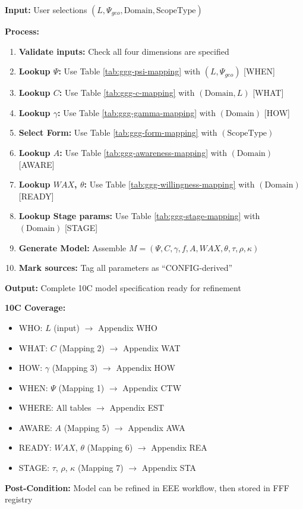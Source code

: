 \begin{tcolorbox}[colback=gray!5!white, colframe=gray!75!black,
    title=Algorithm CONFIG-1: Model Generation (10C Complete)]
\textbf{Input:} User selections $(L, \Psi_{geo}, \text{Domain}, \text{ScopeType})$

\textbf{Process:}
\begin{enumerate}
\item \textbf{Validate inputs:} Check all four dimensions are specified
\item \textbf{Lookup $\Psi$:} Use Table \ref{tab:ggg-psi-mapping} with $(L, \Psi_{geo})$ \hfill [WHEN]
\item \textbf{Lookup $C$:} Use Table \ref{tab:ggg-c-mapping} with $(\text{Domain}, L)$ \hfill [WHAT]
\item \textbf{Lookup $\gamma$:} Use Table \ref{tab:ggg-gamma-mapping} with $(\text{Domain})$ \hfill [HOW]
\item \textbf{Select Form:} Use Table \ref{tab:ggg-form-mapping} with $(\text{ScopeType})$
\item \textbf{Lookup $A$:} Use Table \ref{tab:ggg-awareness-mapping} with $(\text{Domain})$ \hfill [AWARE]
\item \textbf{Lookup $WAX$, $\theta$:} Use Table \ref{tab:ggg-willingness-mapping} with $(\text{Domain})$ \hfill [READY]
\item \textbf{Lookup Stage params:} Use Table \ref{tab:ggg-stage-mapping} with $(\text{Domain})$ \hfill [STAGE]
\item \textbf{Generate Model:} Assemble $M = (\Psi, C, \gamma, f, A, WAX, \theta, \tau, \rho, \kappa)$
\item \textbf{Mark sources:} Tag all parameters as ``CONFIG-derived''
\end{enumerate}

\textbf{Output:} Complete 10C model specification ready for refinement

\textbf{10C Coverage:}
\begin{itemize}[nosep]
\item WHO: $L$ (input) $\rightarrow$ Appendix WHO
\item WHAT: $C$ (Mapping 2) $\rightarrow$ Appendix WAT
\item HOW: $\gamma$ (Mapping 3) $\rightarrow$ Appendix HOW
\item WHEN: $\Psi$ (Mapping 1) $\rightarrow$ Appendix CTW
\item WHERE: All tables $\rightarrow$ Appendix EST
\item AWARE: $A$ (Mapping 5) $\rightarrow$ Appendix AWA
\item READY: $WAX$, $\theta$ (Mapping 6) $\rightarrow$ Appendix REA
\item STAGE: $\tau$, $\rho$, $\kappa$ (Mapping 7) $\rightarrow$ Appendix STA
\end{itemize}

\textbf{Post-Condition:} Model can be refined in EEE workflow, then stored in FFF registry
\end{tcolorbox}

